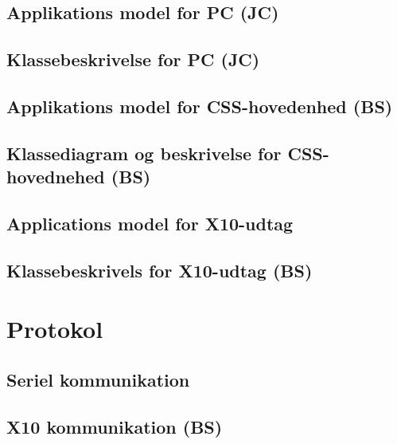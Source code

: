 \subsection{Applikations model for PC (JC)}

\clearpage

\subsection{Klassebeskrivelse for PC (JC)}

\newpage

\subsection{Applikations model for CSS-hovedenhed (BS)}

\clearpage

\subsection{Klassediagram og beskrivelse for CSS-hovednehed (BS)}

\newpage

\newpage
\subsection{Applications model for X10-udtag}

\clearpage

\subsection{Klassebeskrivels for X10-udtag (BS)}

\newpage

\section{Protokol}

\subsection{Seriel kommunikation}


\subsection{X10 kommunikation (BS)}

\newpage